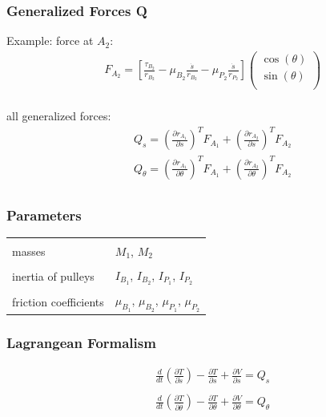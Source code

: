\documentclass{beamer}
\begin{document}
\begin{frame}
	\frametitle{Generalized Forces Q}
	
	Example: force at $A_2$:
	\begin{align*}
	  &F_{A_2} = \left[ \frac{\tau_{B_2}}{r_{B_2}} - \mu_{B_2} 
	  \frac{\dot{s}}{r_{B_2}} - \mu_{P_2} \frac{\dot{s}}{r_{P_2}} \right]
	  \left(
	  \begin{matrix}
	    \cos(\theta) \\
	    \sin(\theta) \\
	  \end{matrix}
	  \right) \\
	\end{align*}
	
	all generalized forces:
	\begin{align*}
	  &Q_s = \left( \frac{\partial r_{A_1}}{\partial s} \right)^T F_{A_1} 
	  + \left( \frac{\partial r_{A_2}}{\partial s} \right)^T F_{A_2} \\
	  &Q_{\theta} = \left( \frac{\partial r_{A_1}}{\partial \theta} 
	  \right)^T F_{A_1} + \left( \frac{\partial r_{A_2}}{\partial \theta} 
	  \right)^T F_{A_2} \\
	\end{align*}
\end{frame}

\begin{frame}
	\frametitle{Parameters}
	
	\begin{tabular}{ll}
	  & \\
	  masses & $M_1$, $M_2$ \\
	  &\\
	  inertia of pulleys & $I_{B_1}$, $I_{B_2}$, $I_{P_1}$, $I_{P_2}$ \\
	  &\\
	  friction coefficients & $\mu_{B_1}$, $\mu_{B_2}$, $\mu_{P_1}$, 
	  $\mu_{P_2}$  \\
	\end{tabular}
\end{frame}

\begin{frame}
	\frametitle{Lagrangean Formalism}
	
	\begin{align*}
	  &\frac{d}{dt}\left(\frac{\partial T}{\partial \dot{s}}\right) -
	  \frac{\partial T}{\partial s} +
	  \frac{\partial V}{\partial s}
	  = Q_s \\
	  &{}\\
	  &\frac{d}{dt}\left(\frac{\partial T}{\partial \dot{\theta}}\right) -
	  \frac{\partial T}{\partial \theta} +
	  \frac{\partial V}{\partial \theta}
	  = Q_{\theta} \\
	\end{align*}
\end{frame}
\end{document}
